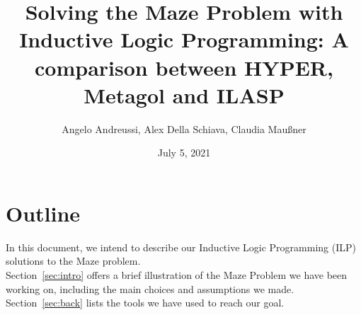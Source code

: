 \documentclass[12pt]{article}
\title{Solving the Maze Problem with Inductive Logic Programming: A comparison between HYPER, Metagol and ILASP}
\author{Angelo Andreussi, Alex Della Schiava, Claudia Mau\ss ner}
\date{July 5, 2021}
\begin{document}
\maketitle

\section{Outline}
In this document, we intend to describe our Inductive Logic Programming (ILP) solutions to the Maze problem.\\
Section~\ref{sec:intro} offers a brief illustration of the Maze Problem we have been working on,
including the main choices and assumptions we made.\\
Section~\ref{sec:back} lists the tools we have used to reach our goal.








\end{document}
